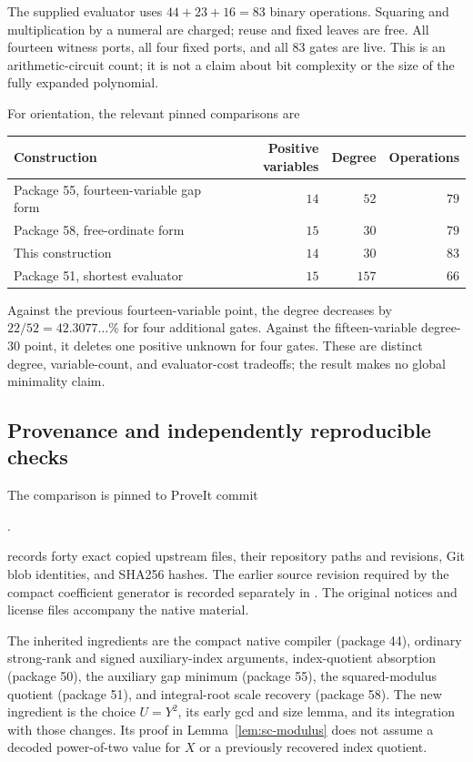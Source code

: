The supplied evaluator uses $44+23+16=83$ binary operations.
Squaring and multiplication by a numeral are charged; reuse and fixed
leaves are free.  All fourteen witness ports, all four fixed ports, and
all $83$ gates are live.  This is an arithmetic-circuit count; it is not a
claim about bit complexity or the size of the fully expanded polynomial.

For orientation, the relevant pinned comparisons are
\begin{center}
\begin{tabular}{lrrr}
\hline
Construction & Positive variables & Degree & Operations\\
\hline
Package 55, fourteen-variable gap form & $14$ & $52$ & $79$\\
Package 58, free-ordinate form & $15$ & $30$ & $79$\\
This construction & $14$ & $30$ & $83$\\
Package 51, shortest evaluator & $15$ & $157$ & $66$\\
\hline
\end{tabular}
\end{center}
Against the previous fourteen-variable point, the degree decreases by
$22/52=42.3077\ldots\%$ for four additional gates.  Against the
fifteen-variable degree-$30$ point, it deletes one positive unknown for
four gates.  These are distinct degree, variable-count, and evaluator-cost
tradeoffs; the result makes no global minimality claim.

\subsection{Provenance and independently reproducible checks}

The comparison is pinned to ProveIt commit
\begin{center}
.
\end{center}
 records forty exact copied upstream files, their
repository paths and revisions, Git blob identities, and SHA256 hashes.
The earlier source revision required by the compact coefficient generator
is recorded separately in .  The original
notices and license files accompany the native material.

The inherited ingredients are the compact native compiler (package 44),
ordinary strong-rank and signed auxiliary-index arguments, index-quotient
absorption (package 50), the auxiliary gap minimum (package 55), the
squared-modulus quotient (package 51), and integral-root scale recovery
(package 58).  The new ingredient is the choice $U=Y^2$, its early gcd and
size lemma, and its integration with those changes.  Its proof in
Lemma~\ref{lem:sc-modulus} does not assume a decoded power-of-two value
for $X$ or a previously recovered index quotient.

